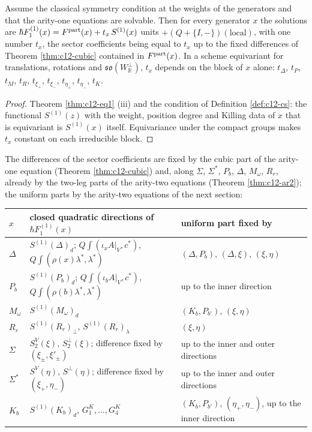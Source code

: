 \begin{theorem}
\label{thm:c12-H}
Assume the classical symmetry condition at the weights of the generators and that the arity-one equations are solvable. Then for every generator $x$ the solutions are $\hbar F_1^{(1)}(x)=F^{\rm part}(x)+t_x\,S^{(1)}(x)$ units $+(Q+\{I,-\})(\text{local})$, with one number $t_x$, the sector coefficients being equal to $t_x$ up to the fixed differences of Theorem \ref{thm:c12-cubic} contained in $F^{\rm part}(x)$. In a scheme equivariant for translations, rotations and $\mathfrak{so}(W_{\mathbb R}^\perp)$, $t_x$ depends on the block of $x$ alone: $t_\Delta$, $t_P$, $t_M$, $t_R$, $t_{\xi_+}$, $t_{\xi_-}$, $t_{\eta_+}$, $t_{\eta_-}$, $t_K$.
\end{theorem}

\begin{proof}
Theorem \ref{thm:c12-eq1} (iii) and the condition of Definition \ref{def:c12-cs}: the functional $S^{(1)}(z)$ with the weight, position degree and Killing data of $x$ that is equivariant is $S^{(1)}(x)$ itself. Equivariance under the compact groups makes $t_x$ constant on each irreducible block.
\end{proof}

\begin{remark}
\label{rem:c12-freetable}
The differences of the sector coefficients are fixed by the cubic part of the arity-one equation (Theorem \ref{thm:c12-cubic}) and, along $\Sigma$, $\Sigma^*$, $P_b$, $\Delta$, $M_\omega$, $R_r$, already by the two-leg parts of the arity-two equations (Theorem \ref{thm:c12-ar2}); the uniform parts by the arity-two equations of the next section:

\begin{tabular}{l|l|l}
$x$ & closed quadratic directions of $\hbar F_1^{(1)}(x)$ & uniform part fixed by\\
\hline
$\Delta$ & $S^{(1)}(\Delta)_d$; $Q\int(\iota_xA|_V,c^*)$, $Q\int(\rho(x)\lambda^*,\lambda^*)$ & $(\Delta,P_b)$, $(\Delta,\xi)$, $(\xi,\eta)$\\
$P_b$ & $S^{(1)}(P_b)_d$; $Q\int(\iota_bA|_V,c^*)$, $Q\int(\rho(b)\lambda^*,\lambda^*)$ & up to the inner direction\\
$M_\omega$ & $S^{(1)}(M_\omega)_d$ & $(K_b,P_{b'})$, $(\xi,\eta)$\\
$R_r$ & $S^{(1)}(R_r)_\perp$, $S^{(1)}(R_r)_\lambda$ & $(\xi,\eta)$\\
$\Sigma$ & $S^V_2(\xi)$, $S^\perp_2(\xi)$; difference fixed by $(\xi_\pm,\xi'_\pm)$ & up to the inner and outer directions\\
$\Sigma^*$ & $S^V(\eta)$, $S^\perp(\eta)$; difference fixed by $(\xi_+,\eta_-)$ & up to the inner and outer directions\\
$K_b$ & $S^{(1)}(K_b)_d$, $G^K_1,\dots,G^K_4$ & $(K_b,P_{b'})$, $(\eta_+,\eta_-)$, up to the inner direction\\
\end{tabular}
\end{remark}

